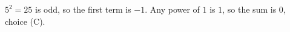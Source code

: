 $5^2=25$ is odd, so the first term is $-1$. Any power of $1$ is $1$, so the sum is $\boxed0$, choice (C).
